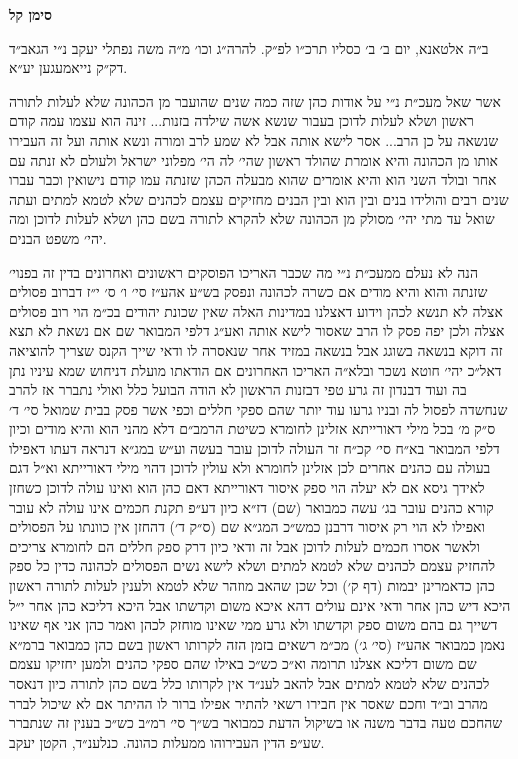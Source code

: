 \documentclass[12pt, openany]{book}
\newcommand{\chapname}{}
\newcommand{\newchap}[1]{
	\addcontentsline{toc}{chapter}{#1}
	\renewcommand{\chapname}{#1}
		\begin{center}
			\textbf{%
\fontsize{16pt}{16pt}\selectfont
				#1}
		\end{center}
}
\begin{document}
\newchap{סימן קל}
\begin{multicols}{2}
ב״ה אלטאנא, יום ב׳ ב׳ כסליו תרכ״ו לפ״ק. להרה״ג וכו׳ מ״ה משה נפתלי יעקב נ״י הגאב״ד דק״ק נייאמעגען יע״א.\\\vspace{0pt}

אשר שאל מעכ״ת נ״י על אודות כהן שזה כמה שנים שהועבר מן הכהונה שלא לעלות לתורה ראשון ושלא לעלות לדוכן בעבור שנשא אשה שילדה בזנות... זינה הוא עצמו עמה קודם שנשאה על כן הרב... אסר לישא אותה אבל לא שמע לרב ומורה ונשא אותה ועל זה העבירו אותו מן הכהונה והיא אומרת שהולד ראשון שהי׳ לה הי׳ מפלוני ישראל ולעולם לא זנתה עם אחר ובולד השני הוא והיא אומרים שהוא מבעלה הכהן שזנתה עמו קודם נישואין וכבר עברו שנים רבים והולידו בנים ובין הוא ובין הבנים מחזיקים עצמם לכהנים שלא לטמא למתים ועתה שואל עד מתי יהי׳ מסולק מן הכהונה שלא להקרא לתורה בשם כהן ושלא לעלות לדוכן ומה יהי׳ משפט הבנים.\\\vspace{0pt}

הנה לא נעלם ממעכ״ת נ״י מה שכבר האריכו הפוסקים ראשונים ואחרונים בדין זה בפנוי׳ שזנתה והוא והיא מודים אם כשרה לכהונה ונפסק בש״ע אהע״ז סי׳ ו׳ ס׳ י״ז דברוב פסולים אצלה לא תנשא לכהן וידוע דאצלנו במדינות האלה שאין שכונת יהודים בכ״מ הוי רוב פסולים אצלה ולכן יפה פסק לו הרב שאסור לישא אותה ואע״ג דלפי המבואר שם אם נשאת לא תצא זה דוקא בנשאה בשוגג אבל בנשאה במזיד אחר שנאסרה לו ודאי שייך הקנס שצריך להוציאה דאל״כ יהי׳ חוטא נשכר ובלא״ה האריכו האחרונים אם הודאתו מועלת דניחוש שמא עיניו נתן בה ועוד דבנדון זה גרע טפי דבזנות הראשון לא הודה הבועל כלל ואולי נתברר אז להרב שנחשדה לפסול לה ובניו גרעו עוד יותר שהם ספקי חללים וכפי אשר פסק בבית שמואל סי׳ ד׳ ס״ק מ׳ בכל מילי דאורייתא אזלינן לחומרא כשיטת הרמב״ם דלא מהני הוא והיא מודים וכיון דלפי המבואר בא״ח סי׳ קכ״ח זר העולה לדוכן עובר בעשה וע״ש במג״א דנראה דעתו דאפילו בעולה עם כהנים אחרים לכן אזלינן לחומרא ולא עולין לדוכן דהוי מילי דאורייתא וא״ל דגם לאידך גיסא אם לא יעלה הוי ספק איסור דאורייתא דאם כהן הוא ואינו עולה לדוכן כשחזן קורא כהנים עובר בג׳ עשה כמבואר (שם) דז״א כיון דע״פ תקנת חכמים אינו עולה לא עובר ואפילו לא הוי רק איסור דרבנן כמש״כ המג״א שם (ס״ק ד׳) דהחזן אין כוונתו על הפסולים ולאשר אסרו חכמים לעלות לדוכן אבל זה ודאי כיון דרק ספק חללים הם לחומרא צריכים להחזיק עצמם לכהנים שלא לטמא למתים ושלא לישא נשים הפסולים לכהונה כדין כל ספק כהן כדאמרינן יבמות (דף ק׳) וכל שכן שהאב מוזהר שלא לטמא ולענין לעלות לתורה ראשון היכא דיש כהן אחר ודאי אינם עולים דהא איכא משום וקדשתו אבל היכא דליכא כהן אחר י״ל דשייך גם בהם משום ספק וקדשתו ולא גרע ממי שאינו מוחזק לכהן ואמר כהן אני אף שאינו נאמן כמבואר אהע״ז (סי׳ ג׳) מכ״מ רשאים בזמן הזה לקרותו ראשון בשם כהן כמבואר ברמ״א שם משום דליכא אצלנו תרומה וא״כ כש״כ באילו שהם ספקי כהנים ולמען יחזיקו עצמם לכהנים שלא לטמא למתים אבל להאב לענ״ד אין לקרותו כלל בשם כהן לתורה כיון דנאסר מהרב וב״ד וחכם שאסר אין חבירו רשאי להתיר אפילו ברור לו ההיתר אם לא שיכול לברר שהחכם טעה בדבר משנה או בשיקול הדעת כמבואר בש״ך סי׳ רמ״ב כש״כ בענין זה שנתברר שע״פ הדין העבירוהו ממעלות כהונה. כנלענ״ד, הקטן יעקב.\\\vspace{0pt}

\end{multicols}\newpage
\end{document}

